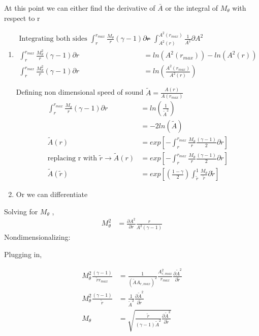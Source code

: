 \documentclass[12pt]{article}
\begin{document}
At this point we can either find the derivative of  $\bar{A}$ or the integral of
$M_{\theta}$ with respect to r
\begin{enumerate}
    \item
\begin{align*}
\text{Integrating both sides } \int_{r}^{r_{max}}\frac{M_{\theta}}{r}\left(\gamma - 1\right){\partial r}  &=\int_{A^2(r)}^{A^2(r_{max})}\frac{1}{A^2}  {\partial A^2}\\
\int_{r}^{r_{max}}\frac{M^2_{\theta}}{r}\left(\gamma - 1\right){\partial r}  &=ln(A^2(r_{max})) - ln(A^2(r)) \\
\int_{r}^{r_{max}}\frac{M^2_{\theta}}{r}\left(\gamma - 1\right){\partial r}  &=ln\left(\frac{A^2(r_{max})}{A^2(r)}\right) 
\end{align*}

Defining non dimensional speed of sound $\tilde{A} = \frac{A(r)}{A(r_{max})}$
\begin{align*}
\int_{r}^{r_{max}}\frac{M_{\theta}}{r}\left(\gamma - 1\right){\partial r}  &=ln\left(\frac{1}{\tilde{A}^2}\right) \\
&= -2ln(\tilde{A})\\
\tilde{A}(r) &= exp\left[-\int_{r}^{r_{max}}\frac{M_{\theta}}{r}\frac{\left(\gamma - 1\right)}{2}{\partial r}\right] \\ \text{replacing r with }\tilde{r} \rightarrow \tilde{A}(r) &= exp\left[-\int_{r}^{r_{max}}\frac{M_{\theta}}{r}\frac{\left(\gamma - 1\right)}{2}{\partial r}\right]		\\
\tilde{A}(\tilde{r}) &= exp\left[\left(\frac{1 - \gamma}{2}\right)\int_{\tilde{r}}^{1}\frac{M_{\theta}}{\tilde{r}}{\partial \tilde{r}}\right]	
\end{align*}
\item Or we can differentiate
\end{enumerate}
Solving for $M_{\theta}$ ,
\begin{align*}
M_{\theta}^2 
&= \frac{\partial A^2}{\partial r} \frac{r}{A^2 \left(\gamma - 1\right)}
\end{align*}
Nondimensionalizing:

Plugging in,

\begin{align} 
    M_{\theta}^2
    \frac{\left( \gamma - 1 \right)}{\widetilde{r} r_{max}} &=
    \frac{1}{(\widetilde{A}A_{r,max})^2}\frac{A_{r,max}^2}{r_{max}}
    \frac{\partial \widetilde{A}^2}{\partial \widetilde{r}} \nonumber \\
    M_{\theta}^2     \frac{\left( \gamma - 1 \right)}{\widetilde{r} } &=
    \frac{1}{\widetilde{A}^2}
    \frac{\partial \widetilde{A}^2}{\partial \widetilde{r}} \nonumber \\
    M_{\theta} &= \sqrt{\frac{\widetilde{r}}{(\gamma-1) \widetilde{A}^2}
        \frac{\partial\widetilde{A}^2}{\partial \widetilde{r} }
    } \label{eq:Mthetabackcalculated}
\end{align}
\end{document}
